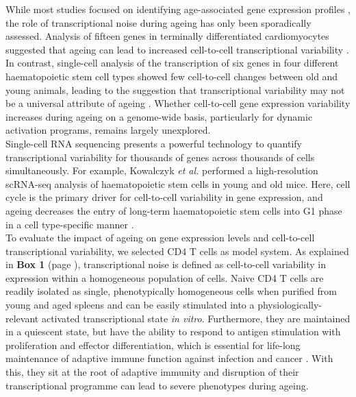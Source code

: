 While most studies focused on identifying age-associated gene expression profiles \citep{DeMagalhaes2009}, the role of transcriptional noise during ageing has only been sporadically assessed. Analysis of fifteen genes in terminally differentiated cardiomyocytes suggested that ageing can lead to increased cell-to-cell transcriptional variability \citep{Bahar2006}. In contrast, single-cell analysis of the transcription of six genes in four different haematopoietic stem cell types showed few cell-to-cell changes between old and young animals, leading to the suggestion that transcriptional variability may not be a universal attribute of ageing \citep{Warren2007}. Whether cell-to-cell gene expression variability increases during ageing on a genome-wide basis, particularly for dynamic activation programs, remains largely unexplored.\\

Single-cell RNA sequencing presents a powerful technology to quantify  transcriptional variability for thousands of genes across thousands of cells simultaneously. For example, Kowalczyk \textit{et al.} performed a high-resolution scRNA-seq analysis of haematopoietic stem cells in young and old mice. Here, cell cycle is the primary driver for cell-to-cell variability in gene expression, and ageing decreases the entry of long-term haematopoietic stem cells into G1 phase in a cell type-specific manner \citep{Kowalczyk2015}.\\ 

To evaluate the impact of ageing on gene expression levels and cell-to-cell transcriptional variability, we selected CD4\plus{} T cells as model system. As explained in \textbf{Box 1} (page \pageref{box1}), transcriptional noise is defined as cell-to-cell variability in expression within a homogeneous population of cells. Naive CD4\plus{} T cells are readily isolated as single, phenotypically homogeneous cells when purified from young and aged spleens and can be easily stimulated into a physiologically-relevant activated transcriptional state \emph{in vitro}. Furthermore, they are maintained in a quiescent state, but have the ability to respond to antigen stimulation with proliferation and effector differentiation, which is essential for life-long maintenance of adaptive immune function against infection and cancer \citep{Swain2012, Kim2014a}. With this, they sit at the root of adaptive immunity and disruption of their transcriptional programme can lead to severe phenotypes during ageing. \\

